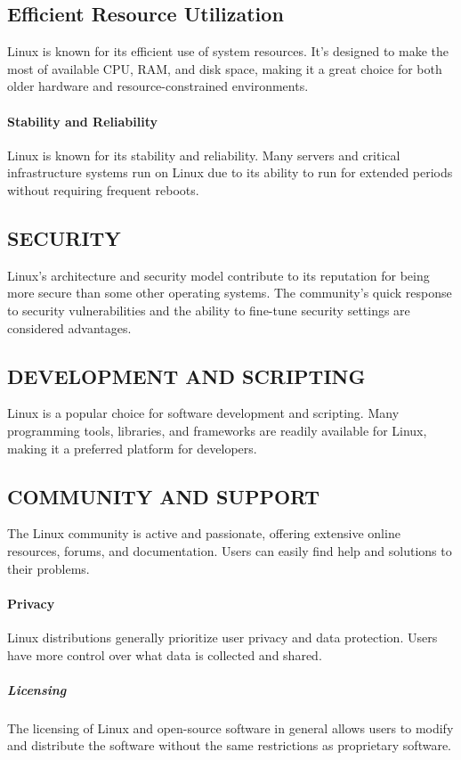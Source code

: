 \documentclass{article}
\begin{document}
\subsection{Efficient Resource Utilization}
Linux is known for its efficient use of system resources. It's designed to make the most of available CPU, RAM, and disk space, making it a great choice for both older hardware and resource-constrained environments.

\paragraph{Stability and  Reliability}
Linux is known for its stability and reliability. Many servers and critical infrastructure systems run on Linux due to its ability to run for extended periods without requiring frequent reboots.

\subsection{SECURITY}
 Linux's architecture and security model contribute to its reputation for being more secure than some other operating systems. The community's quick response to security vulnerabilities and the ability to fine-tune security settings are considered advantages.


\subsection{DEVELOPMENT AND SCRIPTING}
 Linux is a popular choice for software development and scripting. Many programming tools, libraries, and frameworks are readily available for Linux, making it a preferred platform for developers.

\subsection{COMMUNITY AND SUPPORT}
 The Linux community is active and passionate, offering extensive online resources, forums, and documentation. Users can easily find help and solutions to their problems.

\paragraph{Privacy}
Linux distributions generally prioritize user privacy and data protection. Users have more control over what data is collected and shared.

\subparagraph{Licensing}
The licensing of Linux and open-source software in general allows users to modify and distribute the software without the same restrictions as proprietary software.
\end{document}
